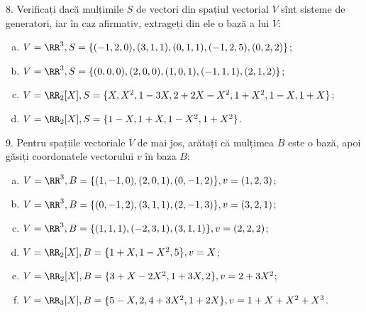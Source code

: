 \vspace{1cm}

8. Verificați dacă mulțimile $ S $ de vectori din spațiul vectorial $ V $ sînt
sisteme de generatori, iar în caz afirmativ, extrageți din ele o bază a lui $ V $:
\begin{enumerate}[(a)]
    \item $ V = \RR^3, S = \{ (-1, 2, 0), (3, 1, 1), (0, 1, 1), (-1, 2, 5), (0, 2, 2) \} $;
    \item $ V = \RR^3, S = \{ (0, 0, 0), (2, 0, 0), (1, 0, 1), (-1, 1, 1), (2, 1, 2) \} $;
    \item $ V = \RR_2[X], S = \{ X, X^2, 1 - 3X, 2 + 2X - X^2, 1 + X^2, 1 - X, 1 + X \} $;
    \item $ V = \RR_2[X], S = \{ 1 - X, 1 + X, 1 - X^2, 1 + X^2 \} $.
\end{enumerate}

\vspace{1cm}

9. Pentru spațiile vectoriale $ V $ de mai jos, arătați că mulțimea $ B $
este o bază, apoi găsiți coordonatele vectorului $ v $ în baza $ B $:
\begin{enumerate}[(a)]
    \item $ V = \RR^3, B = \{ (1, -1, 0), (2, 0, 1), (0, -1, 2) \}, %
        v = (1, 2, 3) $;
    \item $ V = \RR^3, B = \{ (0, -1, 2), (3, 1, 1), (2, -1, 3) \}, %
        v = (3, 2, 1) $;
    \item $ V = \RR^3, B = \{ (1, 1, 1), (-2, 3, 1), (3, 1, 1) \}, %
        v = (2, 2, 2) $;
    \item $ V = \RR_2[X], B = \{ 1 + X, 1 - X^2, 5 \}, v = X $;
    \item $ V = \RR_2[X], B = \{ 3 + X - 2X^2, 1 + 3X, 2 \}, v = 2 + 3X^2 $;
    \item $ V = \RR_3[X], B = \{ 5 - X, 2, 4 + 3X^2, 1 + 2X \}, v = 1 + X + X^2 + X^3 $.
\end{enumerate}
